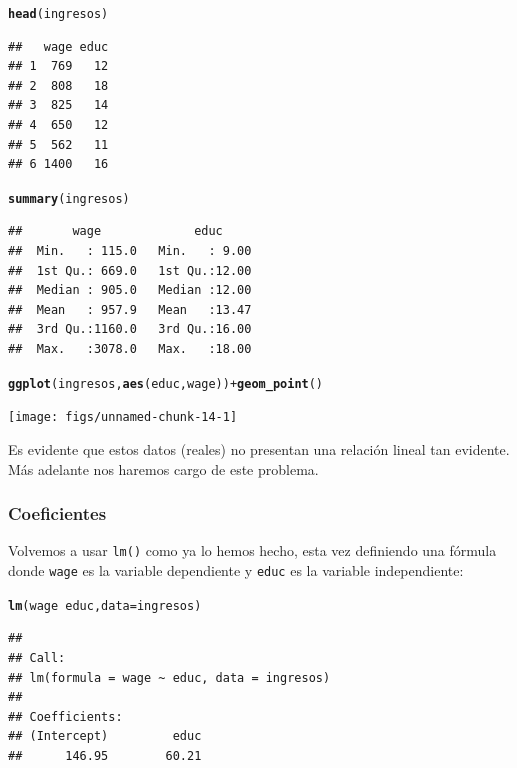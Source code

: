 \documentclass{article}\usepackage[]{graphicx}\usepackage[]{color}
\makeatletter
\newcommand{\hlopt}[1]{\textcolor[rgb]{0,0,0}{#1}}%
\newcommand{\hlstd}[1]{\textcolor[rgb]{0.345,0.345,0.345}{#1}}%
\newcommand{\hlkwc}[1]{\textcolor[rgb]{0.333,0.667,0.333}{#1}}%
\newcommand{\hlkwd}[1]{\textcolor[rgb]{0.737,0.353,0.396}{\textbf{#1}}}%
\newenvironment{kframe}{%
 \def\at@end@of@kframe{}%
 \ifinner\ifhmode%
  \def\at@end@of@kframe{\end{minipage}}%
  \begin{minipage}{\columnwidth}%
 \fi\fi%
 \def\FrameCommand##1{\hskip\@totalleftmargin \hskip-\fboxsep
 \colorbox{shadecolor}{##1}\hskip-\fboxsep
     \hskip-\linewidth \hskip-\@totalleftmargin \hskip\columnwidth}%
 \MakeFramed {\advance\hsize-\width
   \@totalleftmargin\z@ \linewidth\hsize
   \@setminipage}}%
 {\par\unskip\endMakeFramed%
 \at@end@of@kframe}
\newenvironment{knitrout}{}{} %
\makeatother
\begin{document}
\begin{knitrout}
\color{fgcolor}\begin{kframe}
\begin{alltt}
\hlkwd{head}\hlstd{(ingresos)}
\end{alltt}
\begin{verbatim}
##   wage educ
## 1  769   12
## 2  808   18
## 3  825   14
## 4  650   12
## 5  562   11
## 6 1400   16
\end{verbatim}
\begin{alltt}
\hlkwd{summary}\hlstd{(ingresos)}
\end{alltt}
\begin{verbatim}
##       wage             educ      
##  Min.   : 115.0   Min.   : 9.00  
##  1st Qu.: 669.0   1st Qu.:12.00  
##  Median : 905.0   Median :12.00  
##  Mean   : 957.9   Mean   :13.47  
##  3rd Qu.:1160.0   3rd Qu.:16.00  
##  Max.   :3078.0   Max.   :18.00
\end{verbatim}
\begin{alltt}
\hlkwd{ggplot}\hlstd{(ingresos,} \hlkwd{aes}\hlstd{(educ, wage))} \hlopt{+} \hlkwd{geom_point}\hlstd{()}
\end{alltt}
\end{kframe}

{\centering \texttt{[image: figs/unnamed-chunk-14-1]} 

}



\end{knitrout}

Es evidente que estos datos (reales) no presentan una relación lineal tan evidente. Más adelante nos haremos cargo de este problema.

\subsubsection{Coeficientes}

Volvemos a usar \verb|lm()| como ya lo hemos hecho, esta vez definiendo una fórmula donde \verb|wage| es la variable dependiente y \verb|educ| es la variable independiente:
\begin{knitrout}
\color{fgcolor}\begin{kframe}
\begin{alltt}
\hlkwd{lm}\hlstd{(wage} \hlopt{~} \hlstd{educ,} \hlkwc{data} \hlstd{= ingresos)}
\end{alltt}
\begin{verbatim}
## 
## Call:
## lm(formula = wage ~ educ, data = ingresos)
## 
## Coefficients:
## (Intercept)         educ  
##      146.95        60.21
\end{verbatim}
\end{kframe}
\end{knitrout}
\end{document}
